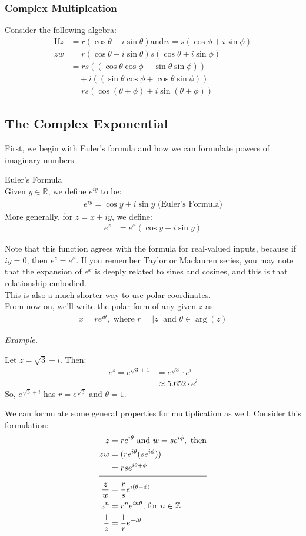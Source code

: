 \documentclass[10pt]{paper}
\newcommand{\Z}{\mathbb{Z}}\newcommand{\R}{\mathbb{R}}\newcommand{\N}{\mathbb{N}}\newcommand{\Q}{\mathbb{Q}}\newcommand{\C}{\mathbb{C}}
\newcommand{\gspc}{\vspace{0.13cm}} %
\newcommand{\gline}[0]{\gspc\\} %
\newcommand{\ahline}{\\[3pt]\hline\\[-8pt]}
\renewenvironment{example}{
  \begin{tcolorbox}[colback=gray!2, colframe=gray!40!white, coltitle=green!20!black, boxrule=3pt, sharp corners, breakable]
    \textit{Example.}
}{\end{tcolorbox}}
\begin{document}
\subsubsection*{Complex Multiplcation}
Consider the following algebra:
\begin{align*} 
  \mathrm{If }z &= r(\cos\theta+i\sin\theta)\mathrm{ and }w=s(\cos\phi+i\sin\phi)\\
  zw&= r (\cos\theta+i\sin\theta)s(\cos\theta+i\sin\phi)\\
  &= rs((\cos\theta\cos\phi-\sin\theta\sin\phi))\\&\quad+i((\sin\theta\cos\phi + \cos\theta\sin\phi))\\
  &= rs(\cos(\theta+\phi)+i\sin(\theta+\phi))
\end{align*}
\subsection{The Complex Exponential}
First, we begin with Euler's formula and how we can formulate powers of imaginary numbers. 
\begin{definition}{Euler's Formula}{}\gline{}
  Given $y\in\R$, we define $e^{iy}$ to be:
  \begin{align*}
    e^{iy}=\cos y + i \sin y \text{ (Euler's Formula)}
  \end{align*}
  More generally, for $z = x + iy$, we define:
  \begin{align*}
    e^{z}&= e^x(\cos y + i\sin y)
  \end{align*}
\end{definition}
Note that this function agrees with the formula for real-valued inputs, because if $iy = 0$, then $e^z = e^x$. If you remember Taylor or Maclauren series, you may note that the expansion of $e^x$ is deeply related to sines and cosines, and this is that relationship embodied. \gline{}
This is also a much shorter way to use polar coordinates. \gline{}From now on, we'll write the polar form of any given $z$ as:
\begin{align*}
  x = re^{i\theta}, \text{ where }r = |z| \text{ and }\theta\in\arg(z)
\end{align*}
\begin{example}
  Let $z = \sqrt 3 + i$. Then:
  \begin{align*}
    e^z = e^{\sqrt 3 + 1} &= e^{\sqrt 3}\cdot e^i\\
    &\approx 5.652\cdot e^{i}
  \end{align*}
  So, $e^{\sqrt 3 + i}$ has $r = e^{\sqrt 3}$ and $\theta = 1$. 
\end{example}
We can formulate some general properties for multiplication as well. Consider this formulation:
\begin{align*}
  z &= re^{i\theta} \text{ and } w= se^{i\phi}, \text{ then}\\
  zw&= (re^{i\theta}(se^{i\phi}))\\
  &= rse^{i\theta + \phi}\ahline
  \frac{z}w &= \frac{r}se^{i(\theta - \phi)}\\
  z^n&= r^ne^{in\theta}\text{, for }n\in\Z\\
  \frac{1}z&= \frac{1}re^{-i\theta}
\end{align*}
\end{document}
